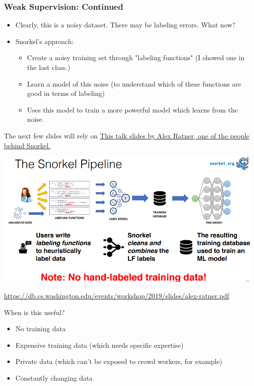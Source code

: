 \documentclass{beamer}
\begin{document}
\begin{frame}
\frametitle{Weak Supervision: Continued}
\begin{itemize}
    \item Clearly, this is a noisy dataset. There may be labeling errors. What now? \pause
    \item Snorkel's approach: \\ 
\begin{itemize}
    \item Create a noisy training set through "labeling functions" (I showed one in the last class.)
    \item Learn a model of this noise (to understand which of these functions are good in terms of labeling)
    \item Uses this model to train a more powerful model which learns from the noise. 
\end{itemize}
\end{itemize}
The next few slides will rely on \href{https://db.cs.washington.edu/events/workshop/2019/slides/alex-ratner.pdf}{This talk slides by Alex Ratner, one of the people behind Snorkel.}
\end{frame}

\begin{frame}{}
    \includegraphics[width=\textwidth]{figures/snorkelradiologyexample.PNG}
    
\href{Source}{https://db.cs.washington.edu/events/workshop/2019/slides/alex-ratner.pdf}
\end{frame}

\begin{frame}{When is this useful?}
    \begin{itemize}
        \item No training data
        \item Expensive training data (which needs specific expertise)
        \item Private data (which can't be exposed to crowd workers, for example)
        \item Constantly changing data
    \end{itemize}
\end{frame}
\end{document}
